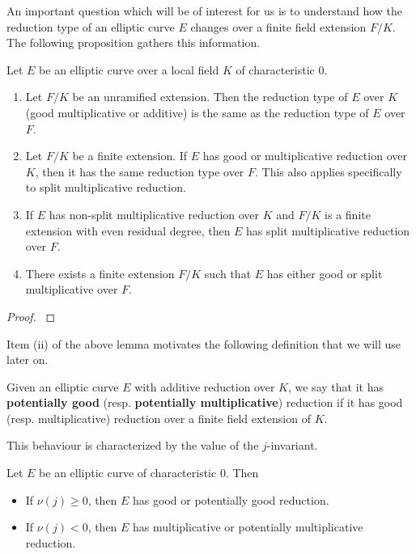 An important question which will be of interest for us is to understand how the reduction type of an elliptic curve $E$ changes over a finite field extension $F/K$. The following proposition gathers this information.

\begin{prop}\label{prop_semi_red}
    Let $E$ be an elliptic curve over a local field $K$ of characteristic $0$. 
    \begin{enumerate}[label={(\roman*)}]
        \item Let $F/K$ be an unramified extension. Then the reduction type of $E$ over $K$ (good multiplicative or additive) is the same as the reduction type of $E$ over $F$.
        \item Let $F/K$ be a finite extension. If $E$ has good or multiplicative reduction over $K$, then it has the same reduction type over $F$. This also applies specifically to split multiplicative reduction.
        \item If $E$ has non-split multiplicative reduction over $K$ and $F/K$ is a finite extension with even residual degree, then $E$ has split multiplicative reduction over $F$. 
        \item There exists a finite extension $F/K$ such that $E$ has either good or split multiplicative over $F$.
    \end{enumerate}
\end{prop}
\begin{proof}
    \cite[\S VII Proposition 5.4]{S1} 
\end{proof}

Item (ii) of the above lemma motivates the following definition that we will use later on.

\begin{defn}
Given an elliptic curve $E$ with additive reduction over $K$, we say that it has \textbf{potentially good} (resp. \textbf{potentially multiplicative}) reduction if it has good (resp. multiplicative) reduction over a finite field extension of $K$. 
\end{defn}
This behaviour is characterized by the value of the $j$-invariant.
\begin{prop}\label{prop_j_inv}
    Let $E$ be an elliptic curve of characteristic $0$. Then
    \begin{itemize}
        \item If $\nu(j)\geq0$, then $E$ has good or potentially good reduction.
        \item If $\nu(j)<0$, then $E$ has multiplicative or potentially multiplicative reduction.
    \end{itemize}
\end{prop}

